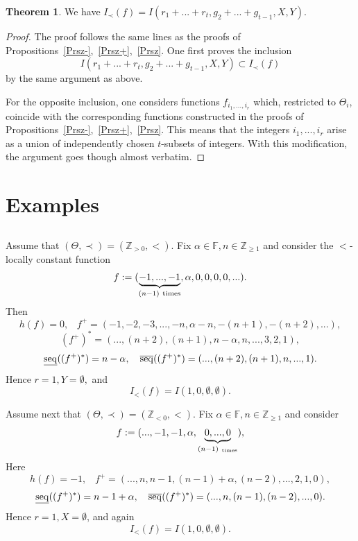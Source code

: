 \documentclass[10pt]{amsart}\oddsidemargin -1mm \evensidemargin -1mm \topmargin -15mm\headheight5mm \headsep 3.5mm \textheight 245mm\textwidth 170mm
\theoremstyle{definition}\newtheorem{theorem}{Theorem}[section]\newtheorem{lemma}[theorem]{Lemma}\newtheorem{remark}[theorem]{Remark}\newtheorem{proposition}[theorem]{Proposition}\newtheorem{corollary}[theorem]{Corollary}\newtheorem{definition}[theorem]{Definition}\newtheorem{Ex}[theorem]{Example}\newtheorem{obs}[theorem]{Observation}\newtheorem{nota}[theorem]{Notation}
\begin{document}


\begin{theorem}\label{T71} We have $I_\prec(f)=I(r_1+...+r_t, g_2+...+g_{t-1}, {X}, {Y})$.\end{theorem}
\begin{proof} The proof follows the same lines as the proofs of Propositions~\ref{Prsz-},~\ref{Prsz+},~\ref{Prsz}. 
One first proves the inclusion
$$I(r_1+...+r_t, g_2+...+g_{t-1}, X, Y)\subset I_\prec(f)$$
by the same argument as above.

For the opposite inclusion, one considers functions $f_{i_1,..., i_r}$ which, restricted to $\Theta_i$, coincide with the corresponding functions constructed in the proofs of Propositions~\ref{Prsz-},~\ref{Prsz+},~\ref{Prsz}. 
This means that the integers $i_1,..., i_r$ arise as a union of independently chosen $t$-subsets of integers. 
With this modification, the argument goes though almost verbatim.
\end{proof}
\section{Examples}
\subsection{}Assume that $(\Theta, \prec)=(\mathbb Z_{>0}, <)$. Fix $\alpha\in\mathbb F, n\in\mathbb Z_{\ge1}$ and consider the $<$-locally constant function
\begin{equation}f:=(\underbrace{-1,..., -1}_{(n-1){\rm~times}}, \alpha, 0, 0, 0, 0,...)\label{Ef-1a0l}.\end{equation}
Then
$$h(f)=0,\hspace{10pt} f^+=(-1, -2, -3,..., -n, \alpha-n, -(n+1), -(n+2),...),$$
$$(f^+)^*=(..., (n+2), (n+1), n-\alpha, n,..., 3, 2, 1),$$
$${\rm\underline{seq}}((f^+)^*)= n-\alpha,\hspace{10pt}{\rm\overline{seq}}((f^+)^*)=(..., (n+2), (n+1), n, ..., 1).$$
Hence $r=1, {Y}=\emptyset,$ and 
$$I_<(f)=I(1, 0, \emptyset, \emptyset).$$

Assume next that $(\Theta, \prec)=(\mathbb Z_{<0}, <)$. 
Fix $\alpha\in\mathbb F, n\in\mathbb Z_{\ge1}$ and consider
\begin{equation}f:=(..., -1, -1, \alpha, \underbrace{0, ..., 0}_{(n-1)_{\rm~times}}),\label{Ef-1a0r}\end{equation}
Here
$$h(f)=-1,\hspace{10pt} f^+=(..., n, n-1, (n-1)+\alpha, (n-2),..., 2, 1, 0),$$
$${\rm\underline{seq}}((f^+)^*)= n-1+\alpha,\hspace{10pt}{\rm\overline{seq}}((f^+)^*)=(..., n, (n-1), (n-2), ..., 0).$$
Hence $r=1, {X}=\emptyset$, and again $$I_<(f)=I(1, 0, \emptyset, \emptyset).$$
\end{document}

